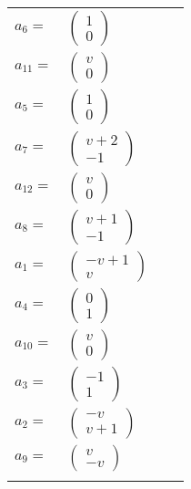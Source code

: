 \documentclass[1p]{elsarticle_modified}
\theoremstyle{definition}
\begin{document}
\begin{tabular}{m{7pt} m{180pt} m{7pt} m{180pt} }
\flushright $a_{6}=$&$\begin{pmatrix}1\\0\end{pmatrix}$ \\
\flushright $a_{11}=$&$\begin{pmatrix}v\\0\end{pmatrix}$ \\
\flushright $a_{5}=$&$\begin{pmatrix}1\\0\end{pmatrix}$ \\
\flushright $a_{7}=$&$\begin{pmatrix}v+2\\-1\end{pmatrix}$ \\
\flushright $a_{12}=$&$\begin{pmatrix}v\\0\end{pmatrix}$ \\
\flushright $a_{8}=$&$\begin{pmatrix}v+1\\-1\end{pmatrix}$ \\
\flushright $a_{1}=$&$\begin{pmatrix}- v+1\\v\end{pmatrix}$ \\
\flushright $a_{4}=$&$\begin{pmatrix}0\\1\end{pmatrix}$ \\
\flushright $a_{10}=$&$\begin{pmatrix}v\\0\end{pmatrix}$ \\
\flushright $a_{3}=$&$\begin{pmatrix}-1\\1\end{pmatrix}$ \\
\flushright $a_{2}=$&$\begin{pmatrix}- v\\v+1\end{pmatrix}$ \\
\flushright $a_{9}=$&$\begin{pmatrix}v\\- v\end{pmatrix}$\\&\end{tabular}
\end{document}
